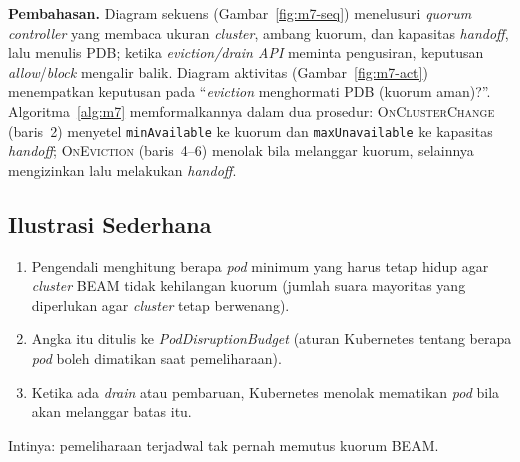 \noindent\textbf{Pembahasan.} Diagram sekuens (Gambar~\ref{fig:m7-seq}) menelusuri
\emph{quorum controller} yang membaca ukuran \emph{cluster}, ambang kuorum, dan kapasitas
\emph{handoff}, lalu menulis PDB; ketika \emph{eviction/drain API} meminta pengusiran,
keputusan \emph{allow}/\emph{block} mengalir balik. Diagram aktivitas
(Gambar~\ref{fig:m7-act}) menempatkan keputusan pada ``\emph{eviction} menghormati PDB
(kuorum aman)?''. Algoritma~\ref{alg:m7} memformalkannya dalam dua prosedur:
\textsc{OnClusterChange} (baris~2) menyetel \texttt{minAvailable} ke kuorum dan
\texttt{maxUnavailable} ke kapasitas \emph{handoff}; \textsc{OnEviction} (baris~4--6)
menolak bila melanggar kuorum, selainnya mengizinkan lalu mela\-kukan \emph{handoff}.

\subsection{Ilustrasi Sederhana}
\label{subsec:m7-ilustrasi}
\begin{enumerate}[nosep,leftmargin=2em]
  \item Pengendali menghitung berapa \emph{pod} minimum yang harus tetap hidup agar
        \emph{cluster} BEAM tidak kehilangan kuorum (jumlah suara mayoritas yang diperlukan
        agar \emph{cluster} tetap berwenang).
  \item Angka itu ditulis ke \emph{PodDisruptionBudget} (aturan Kubernetes tentang berapa
        \emph{pod} boleh dimatikan saat pemeliharaan).
  \item Ketika ada \emph{drain} atau pembaruan, Kubernetes menolak mematikan \emph{pod} bila
        akan melanggar batas itu.
\end{enumerate}
\noindent Intinya: pemeliharaan terjadwal tak pernah memutus kuorum BEAM.


